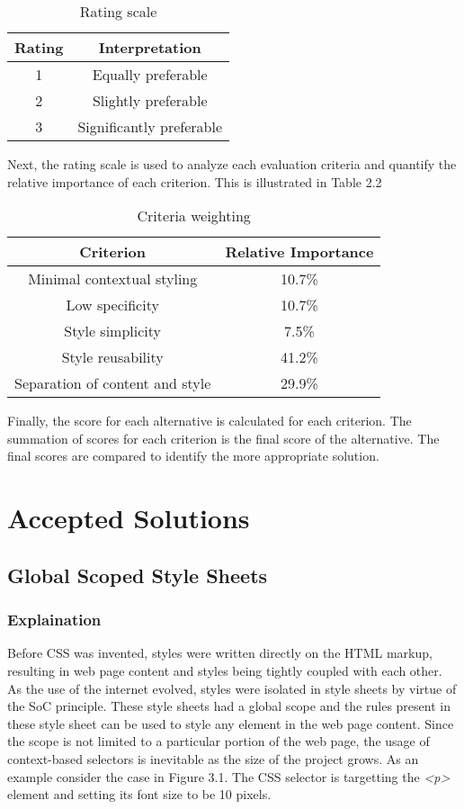 \documentclass[12pt]{article}
\begin{document}
\begin{table}[h]
	\centering
	\begin{tabular}{|c|c|}
		\hline
		\textbf{Rating} & \textbf{Interpretation} \\ 
		\hline
		1 & Equally preferable \\
		\hline 
		2 & Slightly preferable \\
		\hline
		3 & Significantly preferable \\
		\hline
	\end{tabular}
	\caption{Rating scale}
\end{table}

Next, the rating scale is used to analyze each evaluation criteria and quantify the relative importance of each criterion. This is illustrated in Table 2.2

\begin{table}[h]
	\centering
	\begin{tabular}{|c|c|}
		\hline
		\textbf{Criterion} & \textbf{Relative Importance} \\ 
		\hline
		Minimal contextual styling & 10.7\% \\
		\hline 
		Low specificity & 10.7\% \\
		\hline
		Style simplicity & 7.5\% \\
		\hline
		Style reusability & 41.2\% \\
		\hline
		Separation of content and style & 29.9\% \\
		\hline
	\end{tabular}
	\caption{Criteria weighting}
\end{table}

Finally, the score for each alternative is calculated for each criterion. The summation of scores for each criterion is the final score of the alternative. The final scores are compared to identify the more appropriate solution.

\newpage

\section{Accepted Solutions}
\subsection{Global Scoped Style Sheets}
\subsubsection{Explaination}
Before CSS was invented, styles were written directly on the HTML markup, resulting in web page content and styles being tightly coupled with each other. As the use of the internet evolved, styles were isolated in style sheets by virtue of the SoC principle. These style sheets had a global scope and the rules present in these style sheet can be used to style any element in the web page content. Since the scope is not limited to a particular portion of the web page, the usage of context-based selectors is inevitable as the size of the project grows. As an example consider the case in Figure 3.1. The CSS selector is targetting the \textit{<p>} element and setting its font size to be 10 pixels.
\end{document}
